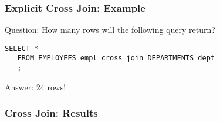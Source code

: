 \documentclass{beamer}
\begin{document}
\begin{frame}[fragile]
  \frametitle{Explicit Cross Join: Example}

  Question: How many rows will the following query return?
  \bigskip

  \begin{lstlisting}[title={\tiny Source: https://github.com/Choens/sql-survival-guide/blob/master/sql/04-joins/cross-joins.sql}]
   SELECT *
   FROM EMPLOYEES empl cross join DEPARTMENTS dept
   ; 
  \end{lstlisting}
  
  \bigskip
  \pause 
  Answer: 24 rows!
  
\end{frame}

\begin{frame}
  \frametitle{Cross Join: Results}


\end{frame}
\end{document}
